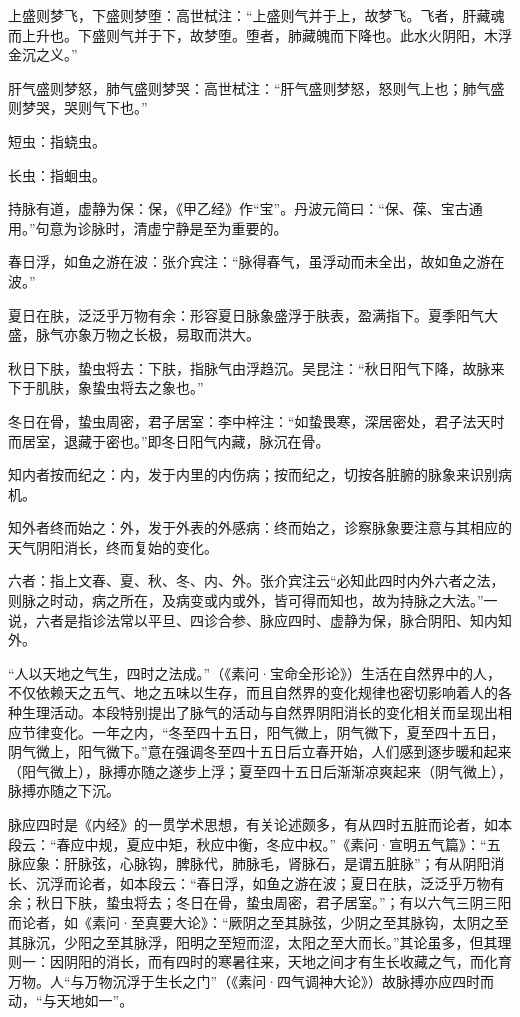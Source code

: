 \documentclass[12pt]{ctexbook}
\begin{document}
\begin{jiaozhu}
	\item 上盛则梦飞，下盛则梦堕：高世栻注：“上盛则气并于上，故梦飞。飞者，肝藏魂而上升也。下盛则气并于下，故梦堕。堕者，肺藏魄而下降也。此水火阴阳，木浮金沉之义。”
	\item 肝气盛则梦怒，肺气盛则梦哭：高世栻注：“肝气盛则梦怒，怒则气上也；肺气盛则梦哭，哭则气下也。”
	\item 短虫：指蛲虫。
	\item 长虫：指蛔虫。
	\item 持脉有道，虚静为保：保，《甲乙经》作“宝”。丹波元简曰：“保、葆、宝古通用。”句意为诊脉时，清虚宁静是至为重要的。
	\item 春日浮，如鱼之游在波：张介宾注：“脉得春气，虽浮动而未全出，故如鱼之游在波。”
	\item 夏日在肤，泛泛乎万物有余：形容夏日脉象盛浮于肤表，盈满指下。夏季阳气大盛，脉气亦象万物之长极，易取而洪大。
	\item 秋日下肤，蛰虫将去：下肤，指脉气由浮趋沉。吴昆注：“秋日阳气下降，故脉来下于肌肤，象蛰虫将去之象也。”
	\item 冬日在骨，蛰虫周密，君子居室：李中梓注：“如蛰畏寒，深居密处，君子法天时而居室，退藏于密也。”即冬日阳气内藏，脉沉在骨。
	\item 知内者按而纪之：内，发于内里的内伤病；按而纪之，切按各脏腑的脉象来识别病机。
	\item 知外者终而始之：外，发于外表的外感病：终而始之，诊察脉象要注意与其相应的天气阴阳消长，终而复始的变化。
	\item 六者：指上文春、夏、秋、冬、内、外。张介宾注云“必知此四时内外六者之法，则脉之时动，病之所在，及病变或内或外，皆可得而知也，故为持脉之大法。”一说，六者是指诊法常以平旦、四诊合参、脉应四时、虚静为保，脉合阴阳、知内知外。
\end{jiaozhu}



“人以天地之气生，四时之法成。”（《素问·宝命全形论》）生活在自然界中的人，不仅依赖天之五气、地之五味以生存，而且自然界的变化规律也密切影响着人的各种生理活动。本段特别提出了脉气的活动与自然界阴阳消长的变化相关而呈现出相应节律变化。一年之内，“冬至四十五日，阳气微上，阴气微下，夏至四十五日，阴气微上，阳气微下。”意在强调冬至四十五日后立春开始，人们感到逐步暖和起来（阳气微上），脉搏亦随之遂步上浮；夏至四十五日后渐渐凉爽起来（阴气微上），脉搏亦随之下沉。

脉应四时是《内经》的一贯学术思想，有关论述颇多，有从四时五脏而论者，如本段云：“春应中规，夏应中矩，秋应中衡，冬应中权。”《素问·宣明五气篇》：“五脉应象：肝脉弦，心脉钩，脾脉代，肺脉毛，肾脉石，是谓五脏脉”；有从阴阳消长、沉浮而论者，如本段云：“春日浮，如鱼之游在波；夏日在肤，泛泛乎万物有余；秋日下肤，蛰虫将去；冬日在骨，蛰虫周密，君子居室。”；有以六气三阴三阳而论者，如《素问·至真要大论》：“厥阴之至其脉弦，少阴之至其脉钩，太阴之至其脉沉，少阳之至其脉浮，阳明之至短而涩，太阳之至大而长。”其论虽多，但其理则一：因阴阳的消长，而有四时的寒暑往来，天地之间才有生长收藏之气，而化育万物。人“与万物沉浮于生长之门”（《素问·四气调神大论》）故脉搏亦应四时而动，“与天地如一”。
\end{document}
